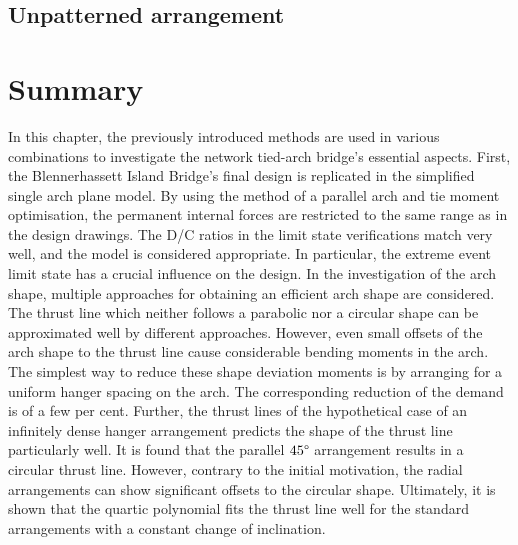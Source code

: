 \subsection{Unpatterned arrangement} \label{sec:unpatterned}


\newpage
\section{Summary} \label{sec:res_summary}
In this chapter, the previously introduced methods are used in various combinations to investigate the network tied-arch bridge's essential aspects. First, the Blennerhassett Island Bridge's final design is replicated in the simplified single arch plane model. By using the method of a parallel arch and tie moment optimisation, the permanent internal forces are restricted to the same range as in the design drawings. The D/C ratios in the limit state verifications match very well, and the model is considered appropriate. In particular, the extreme event limit state has a crucial influence on the design. In the investigation of the arch shape, multiple approaches for obtaining an efficient arch shape are considered. The thrust line which neither follows a parabolic nor a circular shape can be approximated well by different approaches. However, even small offsets of the arch shape to the thrust line cause considerable bending moments in the arch. The simplest way to reduce these shape deviation moments is by arranging for a uniform hanger spacing on the arch. The corresponding reduction of the demand is of a few per cent. Further, the thrust lines of the hypothetical case of an infinitely dense hanger arrangement predicts the shape of the thrust line particularly well. It is found that the parallel $45\degree$ arrangement results in a circular thrust line. However, contrary to the initial motivation, the radial arrangements can show significant offsets to the circular shape. Ultimately, it is shown that the quartic polynomial fits the thrust line well for the standard arrangements with a constant change of inclination. \medskip


